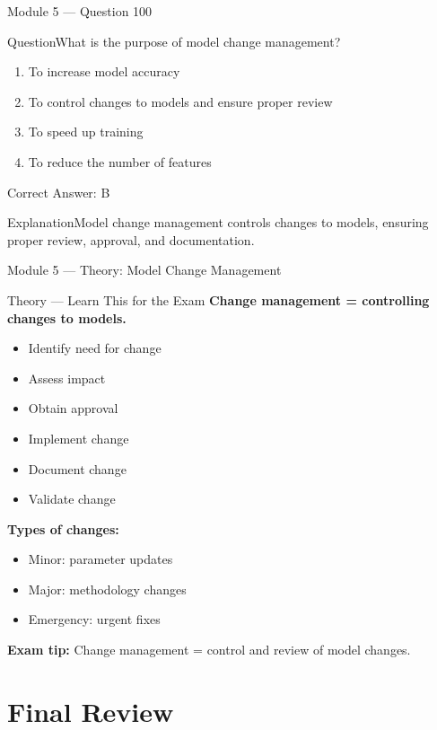 \documentclass[aspectratio=169,10pt]{beamer}
\newcommand{\question}[1]{\begin{block}{Question}#1\end{block}}
\newcommand{\options}[4]{%
	\begin{enumerate}[label=\Alph*.,leftmargin=*]
		\item #1
		\item #2
		\item #3
		\item #4
	\end{enumerate}
}
\newcommand{\answerbox}[1]{\begin{exampleblock}{Correct Answer: #1}\end{exampleblock}}
\newcommand{\explain}[1]{\begin{block}{Explanation}#1\end{block}}
\newcommand{\theory}[1]{%
	\begin{block}{Theory --- Learn This for the Exam}
		\small #1
	\end{block}
}
\begin{document}
	\begin{frame}{Module 5 --- Question 100}
		\question{What is the purpose of model change management?}
		\options{To increase model accuracy}{To control changes to models and ensure proper review}{To speed up training}{To reduce the number of features}
		\answerbox{B}
		\explain{Model change management controls changes to models, ensuring proper review, approval, and documentation.}
	\end{frame}
	
	\begin{frame}{Module 5 --- Theory: Model Change Management}
		\theory{
			\textbf{Change management = controlling changes to models.}
			\begin{itemize}
				\item Identify need for change
				\item Assess impact
				\item Obtain approval
				\item Implement change
				\item Document change
				\item Validate change
			\end{itemize}
			\textbf{Types of changes:}
			\begin{itemize}
				\item Minor: parameter updates
				\item Major: methodology changes
				\item Emergency: urgent fixes
			\end{itemize}
			\textbf{Exam tip:} Change management = control and review of model changes.
		}
	\end{frame}
	
	\section{Final Review}
	
\end{document}
